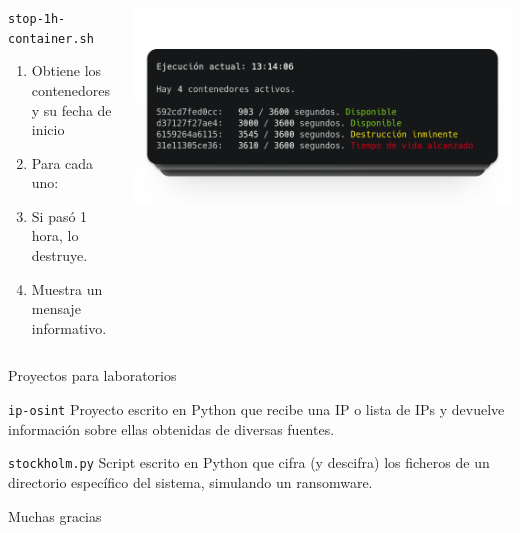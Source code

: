     \begin{frame}
        \begin{columns}[c]
                \begin{block}{\texttt{stop-1h-container.sh}}
                    \scriptsize

            \begin{enumerate}
                \item {Obtiene los contenedores\\y su fecha de inicio}
                \item Para cada uno:
                \item Si pasó 1 hora, lo destruye.
                \item Muestra un mensaje informativo.
            \end{enumerate}
                \end{block}
            
                \includegraphics[scale=0.2]{images/capturas/cron.png}
        \end{columns}
    \end{frame}

    \begin{frame}{Proyectos para laboratorios}
        \begin{block}{\texttt{ip-osint}}
            Proyecto escrito en Python que recibe una IP o lista de IPs y devuelve información sobre ellas obtenidas de diversas fuentes.
        \end{block}
        
        \begin{block}{\texttt{stockholm.py}}
            Script escrito en Python que cifra (y descifra) los ficheros de un directorio específico del sistema, simulando un ransomware.
        \end{block}
    \end{frame}

    \begin{frame}
        \Huge{\centerline{Muchas gracias}}
    \end{frame}
